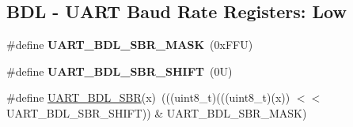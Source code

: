 \subsection*{B\+DL -\/ U\+A\+RT Baud Rate Registers\+: Low}
\begin{DoxyCompactItemize}
\item 
\mbox{\label{group___u_a_r_t___register___masks_ga4471e77a5cfda8db1950aac0b204d964}} 
\#define {\bfseries U\+A\+R\+T\+\_\+\+B\+D\+L\+\_\+\+S\+B\+R\+\_\+\+M\+A\+SK}~(0x\+F\+F\+U)
\item 
\mbox{\label{group___u_a_r_t___register___masks_gad59af590652e14fd8d4a0d46ce48205a}} 
\#define {\bfseries U\+A\+R\+T\+\_\+\+B\+D\+L\+\_\+\+S\+B\+R\+\_\+\+S\+H\+I\+FT}~(0\+U)
\item 
\#define \mbox{\hyperlink{group___u_a_r_t___register___masks_ga558b42c8b256ac9201985ce5c618f642}{U\+A\+R\+T\+\_\+\+B\+D\+L\+\_\+\+S\+BR}}(x)~(((uint8\+\_\+t)(((uint8\+\_\+t)(x)) $<$$<$ U\+A\+R\+T\+\_\+\+B\+D\+L\+\_\+\+S\+B\+R\+\_\+\+S\+H\+I\+FT)) \& U\+A\+R\+T\+\_\+\+B\+D\+L\+\_\+\+S\+B\+R\+\_\+\+M\+A\+SK)
\end{DoxyCompactItemize}

